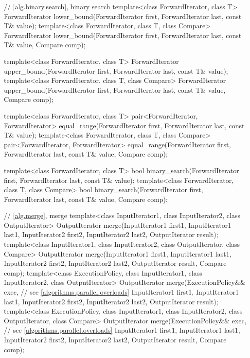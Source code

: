 \begin{codeblock}
{  // \ref{alg.binary.search}, binary search
  template<class ForwardIterator, class T>
    ForwardIterator lower_bound(ForwardIterator first, ForwardIterator last,
                                const T& value);
  template<class ForwardIterator, class T, class Compare>
    ForwardIterator lower_bound(ForwardIterator first, ForwardIterator last,
                                const T& value, Compare comp);

  template<class ForwardIterator, class T>
    ForwardIterator upper_bound(ForwardIterator first, ForwardIterator last,
                                const T& value);
  template<class ForwardIterator, class T, class Compare>
    ForwardIterator upper_bound(ForwardIterator first, ForwardIterator last,
                                const T& value, Compare comp);

  template<class ForwardIterator, class T>
    pair<ForwardIterator, ForwardIterator>
      equal_range(ForwardIterator first, ForwardIterator last,
                  const T& value);
  template<class ForwardIterator, class T, class Compare>
    pair<ForwardIterator, ForwardIterator>
      equal_range(ForwardIterator first, ForwardIterator last,
                  const T& value, Compare comp);

  template<class ForwardIterator, class T>
    bool binary_search(ForwardIterator first, ForwardIterator last,
                       const T& value);
  template<class ForwardIterator, class T, class Compare>
    bool binary_search(ForwardIterator first, ForwardIterator last,
                       const T& value, Compare comp);

  // \ref{alg.merge}, merge
  template<class InputIterator1, class InputIterator2, class OutputIterator>
    OutputIterator merge(InputIterator1 first1, InputIterator1 last1,
                         InputIterator2 first2, InputIterator2 last2,
                         OutputIterator result);
  template<class InputIterator1, class InputIterator2, class OutputIterator,
           class Compare>
    OutputIterator merge(InputIterator1 first1, InputIterator1 last1,
                         InputIterator2 first2, InputIterator2 last2,
                         OutputIterator result, Compare comp);
  template<class ExecutionPolicy, class InputIterator1, class InputIterator2,
           class OutputIterator>
    OutputIterator merge(ExecutionPolicy&& exec, // see \ref{algorithms.parallel.overloads}
                         InputIterator1 first1, InputIterator1 last1,
                         InputIterator2 first2, InputIterator2 last2,
                         OutputIterator result);
  template<class ExecutionPolicy, class InputIterator1, class InputIterator2,
           class OutputIterator, class Compare>
    OutputIterator merge(ExecutionPolicy&& exec, // see \ref{algorithms.parallel.overloads}
                         InputIterator1 first1, InputIterator1 last1,
                         InputIterator2 first2, InputIterator2 last2,
                         OutputIterator result, Compare comp);

}
\end{codeblock}
